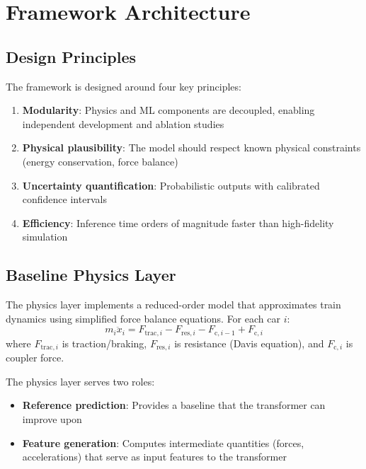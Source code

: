 \chapter{Framework Architecture}
\label{ch:framework}

\section{Design Principles}

The framework is designed around four key principles:

\begin{enumerate}
    \item \textbf{Modularity}: Physics and ML components are decoupled, enabling independent development and ablation studies
    \item \textbf{Physical plausibility}: The model should respect known physical constraints (energy conservation, force balance)
    \item \textbf{Uncertainty quantification}: Probabilistic outputs with calibrated confidence intervals
    \item \textbf{Efficiency}: Inference time orders of magnitude faster than high-fidelity simulation
\end{enumerate}


\section{Baseline Physics Layer}

The physics layer implements a reduced-order model that approximates train dynamics using simplified force balance equations. For each car $i$:
\begin{equation}
    m_i \ddot{x}_i = F_{\text{trac},i} - F_{\text{res},i} - F_{\text{c},i-1} + F_{\text{c},i}
    \label{eq:physics_force_balance}
\end{equation}
where $F_{\text{trac},i}$ is traction/braking, $F_{\text{res},i}$ is resistance (Davis equation), and $F_{\text{c},i}$ is coupler force.

The physics layer serves two roles:
\begin{itemize}
    \item \textbf{Reference prediction}: Provides a baseline that the transformer can improve upon
    \item \textbf{Feature generation}: Computes intermediate quantities (forces, accelerations) that serve as input features to the transformer
\end{itemize}


